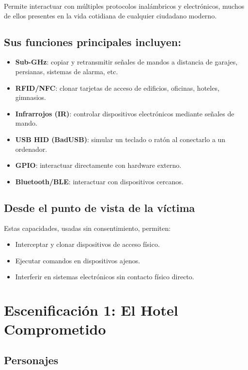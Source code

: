 \documentclass[a4paper,12pt]{article}
\begin{document}
Permite interactuar con múltiples protocolos inalámbricos y electrónicos, muchos de ellos presentes en la vida cotidiana de cualquier ciudadano moderno.

\subsection{Sus funciones principales incluyen:}

\begin{itemize}
    \item \textbf{Sub-GHz}: copiar y retransmitir señales de mandos a distancia de garajes, persianas, sistemas de alarma, etc.
    \item \textbf{RFID/NFC}: clonar tarjetas de acceso de edificios, oficinas, hoteles, gimnasios.
    \item \textbf{Infrarrojos (IR)}: controlar dispositivos electrónicos mediante señales de mando.
    \item \textbf{USB HID (BadUSB)}: simular un teclado o ratón al conectarlo a un ordenador.
    \item \textbf{GPIO}: interactuar directamente con hardware externo.
    \item \textbf{Bluetooth/BLE}: interactuar con dispositivos cercanos.
\end{itemize}

\subsection{Desde el punto de vista de la víctima}

Estas capacidades, usadas sin consentimiento, permiten:

\begin{itemize}
    \item Interceptar y clonar dispositivos de acceso físico.
    \item Ejecutar comandos en dispositivos ajenos.
    \item Interferir en sistemas electrónicos sin contacto físico directo.
\end{itemize}

\newpage

\section{Escenificación 1: El Hotel Comprometido}

\subsection*{Personajes}
\end{document}
